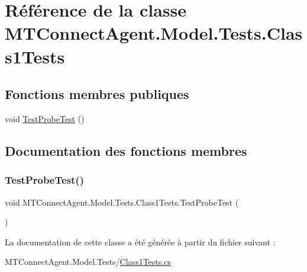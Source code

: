 \hypertarget{class_m_t_connect_agent_1_1_model_1_1_tests_1_1_class1_tests}{}\section{Référence de la classe M\+T\+Connect\+Agent.\+Model.\+Tests.\+Class1\+Tests}
\label{class_m_t_connect_agent_1_1_model_1_1_tests_1_1_class1_tests}
\subsection*{Fonctions membres publiques}
\begin{DoxyCompactItemize}
\item 
void \mbox{\hyperlink{class_m_t_connect_agent_1_1_model_1_1_tests_1_1_class1_tests_ab2f1a61846162aa0094fecb273232c34}{Test\+Probe\+Test}} ()
\end{DoxyCompactItemize}


\subsection{Documentation des fonctions membres}
\mbox{\label{class_m_t_connect_agent_1_1_model_1_1_tests_1_1_class1_tests_ab2f1a61846162aa0094fecb273232c34}} 
\subsubsection{\texorpdfstring{Test\+Probe\+Test()}{TestProbeTest()}}
{\footnotesize\ttfamily void M\+T\+Connect\+Agent.\+Model.\+Tests.\+Class1\+Tests.\+Test\+Probe\+Test (\begin{DoxyParamCaption}{ }\end{DoxyParamCaption})\hspace{0.3cm}{\ttfamily [inline]}}



La documentation de cette classe a été générée à partir du fichier suivant \+:\begin{DoxyCompactItemize}
\item 
M\+T\+Connect\+Agent.\+Model.\+Tests/\mbox{\hyperlink{_class1_tests_8cs}{Class1\+Tests.\+cs}}\end{DoxyCompactItemize}
